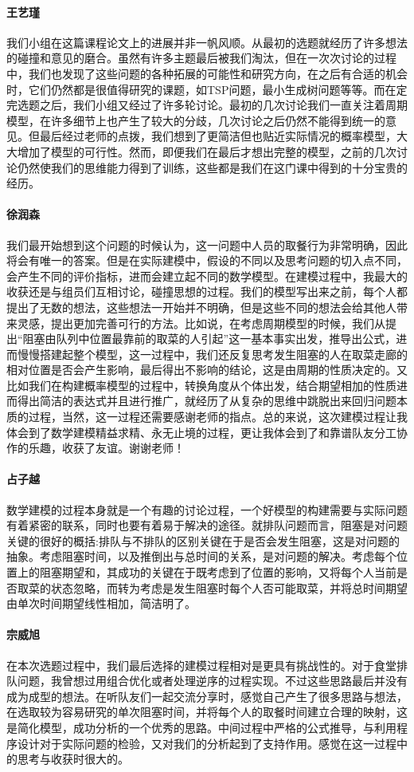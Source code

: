 \documentclass[lang=cn,10pt,a4paper]{elegantpaper}
\begin{document}
\paragraph{王艺瑾}
我们小组在这篇课程论文上的进展并非一帆风顺。从最初的选题就经历了许多想法的碰撞和意见的磨合。虽然有许多主题最后被我们淘汰，但在一次次讨论的过程中，我们也发现了这些问题的各种拓展的可能性和研究方向，在之后有合适的机会时，它们仍然都是很值得研究的课题，如TSP问题，最小生成树问题等等。而在定完选题之后，我们小组又经过了许多轮讨论。最初的几次讨论我们一直关注着周期模型，在许多细节上也产生了较大的分歧，几次讨论之后仍然不能得到统一的意见。但最后经过老师的点拨，我们想到了更简洁但也贴近实际情况的概率模型，大大增加了模型的可行性。然而，即便我们在最后才想出完整的模型，之前的几次讨论仍然使我们的思维能力得到了训练，这些都是我们在这门课中得到的十分宝贵的经历。
\paragraph{徐润森}
我们最开始想到这个问题的时候认为，这一问题中人员的取餐行为非常明确，因此将会有唯一的答案。但是在实际建模中，假设的不同以及思考问题的切入点不同，会产生不同的评价指标，进而会建立起不同的数学模型。在建模过程中，我最大的收获还是与组员们互相讨论，碰撞思想的过程。我们的模型写出来之前，每个人都提出了无数的想法，这些想法一开始并不明确，但是这些不同的想法会给其他人带来灵感，提出更加完善可行的方法。比如说，在考虑周期模型的时候，我们从提出“阻塞由队列中位置最靠前的取菜的人引起”这一基本事实出发，推导出公式，进而慢慢搭建起整个模型，这一过程中，我们还反复思考发生阻塞的人在取菜走廊的相对位置是否会产生影响，最后得出不影响的结论，这是由周期的性质决定的。又比如我们在构建概率模型的过程中，转换角度从个体出发，结合期望相加的性质进而得出简洁的表达式并且进行推广，就经历了从复杂的思维中跳脱出来回归问题本质的过程，当然，这一过程还需要感谢老师的指点。总的来说，这次建模过程让我体会到了数学建模精益求精、永无止境的过程，更让我体会到了和靠谱队友分工协作的乐趣，收获了友谊。谢谢老师！
\paragraph{占子越}
数学建模的过程本身就是一个有趣的讨论过程，一个好模型的构建需要与实际问题有着紧密的联系，同时也要有着易于解决的途径。就排队问题而言，阻塞是对问题关键的很好的概括:排队与不排队的区别关键在于是否会发生阻塞，这是对问题的抽象。考虑阻塞时间，以及推倒出与总时间的关系，是对问题的解决。考虑每个位置上的阻塞期望和，其成功的关键在于既考虑到了位置的影响，又将每个人当前是否取菜的状态忽略，而转为考虑是发生阻塞时每个人否可能取菜，并将总时间期望由单次时间期望线性相加，简洁明了。
\paragraph{宗威旭}
在本次选题过程中，我们最后选择的建模过程相对是更具有挑战性的。对于食堂排队问题，我曾想过用组合优化或者处理逆序的过程实现。不过这些思路最后并没有成为成型的想法。在听队友们一起交流分享时，感觉自己产生了很多思路与想法，在选取较为容易研究的单次阻塞时间，并将每个人的取餐时间建立合理的映射，这是简化模型，成功分析的一个优秀的思路。中间过程中严格的公式推导，与利用程序设计对于实际问题的检验，又对我们的分析起到了支持作用。感觉在这一过程中的思考与收获时很大的。
\end{document}
